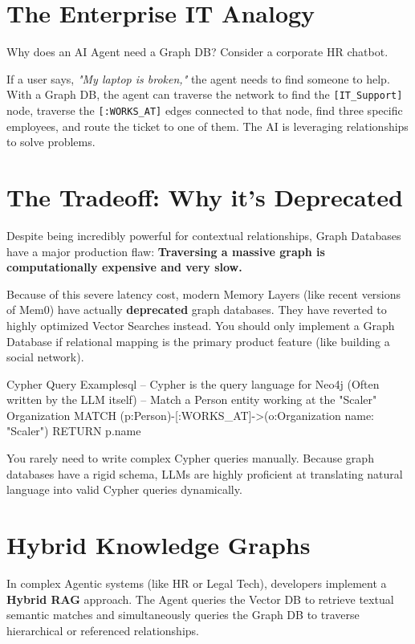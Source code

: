 \documentclass[12pt,a4paper,oneside]{book}
\begin{document}
\section{The Enterprise IT Analogy}
Why does an AI Agent need a Graph DB? Consider a corporate HR chatbot.

If a user says, \textit{"My laptop is broken,"} the agent needs to find someone to help. With a Graph DB, the agent can traverse the network to find the \texttt{[IT\_Support]} node, traverse the \texttt{[:WORKS\_AT]} edges connected to that node, find three specific employees, and route the ticket to one of them. The AI is leveraging relationships to solve problems.

\section{The Tradeoff: Why it's Deprecated}
Despite being incredibly powerful for contextual relationships, Graph Databases have a major production flaw: \textbf{Traversing a massive graph is computationally expensive and very slow.}

Because of this severe latency cost, modern Memory Layers (like recent versions of Mem0) have actually \textbf{deprecated} graph databases. They have reverted to highly optimized Vector Searches instead. You should only implement a Graph Database if relational mapping is the primary product feature (like building a social network).

\begin{codeblock}{Cypher Query Example}{sql}
	-- Cypher is the query language for Neo4j (Often written by the LLM itself)
	-- Match a Person entity working at the "Scaler" Organization
	MATCH (p:Person)-[:WORKS_AT]->(o:Organization {name: "Scaler"})
	RETURN p.name
\end{codeblock}

\begin{tipbox}
	You rarely need to write complex Cypher queries manually. Because graph databases have a rigid schema, LLMs are highly proficient at translating natural language into valid Cypher queries dynamically.
\end{tipbox}

\section{Hybrid Knowledge Graphs}
In complex Agentic systems (like HR or Legal Tech), developers implement a \textbf{Hybrid RAG} approach. The Agent queries the Vector DB to retrieve textual semantic matches and simultaneously queries the Graph DB to traverse hierarchical or referenced relationships.
\end{document}
